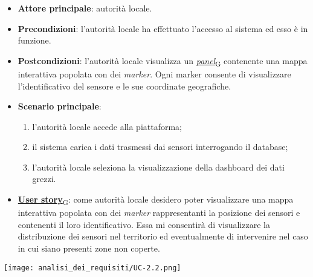 \begin{itemize}
	\item \textbf{Attore principale}: autorità locale.
	\item \textbf{Precondizioni}: l'autorità locale ha effettuato l'accesso al sistema ed esso è in funzione.
	\item \textbf{Postcondizioni}: l'autorità locale visualizza un \href{https://7last.github.io/docs/rtb/documentazione-interna/glossario\#panel}{\textit{panel}\textsubscript{G}} contenente una mappa interattiva
	      popolata con dei \textit{marker}. Ogni marker consente di visualizzare l'identificativo del sensore e le sue coordinate geografiche.
	\item \textbf{Scenario principale}:
	      \begin{enumerate}
		      \item l'autorità locale accede alla piattaforma;
		      \item il sistema carica i dati trasmessi dai sensori interrogando il database;
		      \item l'autorità locale seleziona la visualizzazione della dashboard dei dati grezzi.
	      \end{enumerate}
	\item \href{https://7last.github.io/docs/rtb/documentazione-interna/glossario\#user-story}{\textbf{User story}\textsubscript{G}}: come autorità locale desidero poter visualizzare una mappa interattiva popolata con dei \textit{marker} rappresentanti
	      la posizione dei sensori e contenenti il loro identificativo. Essa mi consentirà di visualizzare la distribuzione dei sensori nel territorio
	      ed eventualmente di intervenire nel caso in cui siano presenti zone non coperte.
\end{itemize}
\begin{center}
	\texttt{[image: analisi\_dei\_requisiti/UC-2.2.png]}
\end{center}


